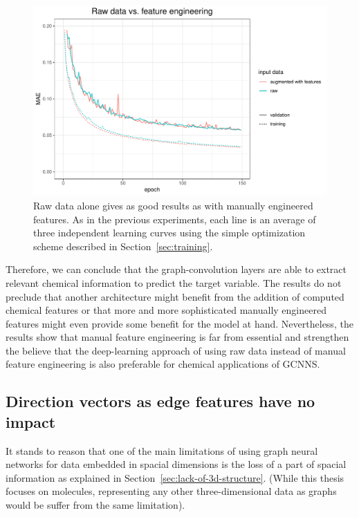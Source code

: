 \begin{figure}[H]
	\includegraphics[width=\linewidth]{figures/raw-data}
	\caption{Raw data alone gives as good results as with manually engineered features. As in the previous experiments, each line is an average of three independent learning curves using the simple optimization scheme described in Section~\ref{sec:training}.}
	\label{fig:raw-data}
\end{figure}

Therefore, we can conclude that the graph-convolution layers are able to extract relevant chemical information to predict the target variable. The results do not preclude that another architecture might benefit from the addition of computed chemical features or that more and more sophisticated manually engineered features might even provide some benefit for the model at hand. Nevertheless, the results show that manual feature engineering is far from essential and strengthen the believe that the deep-learning approach of using raw data instead of manual feature engineering is also preferable for chemical applications of GCNNS.


\subsection{Direction vectors as edge features have no impact}
\label{sec:direction-vectors}

It stands to reason that one of the main limitations of using graph neural networks for data embedded in spacial dimensions is the loss of a part of spacial information as explained in Section~\ref{sec:lack-of-3d-structure}. (While this thesis focuses on molecules, representing any other three-dimensional data as graphs would be suffer from the same limitation).
	
